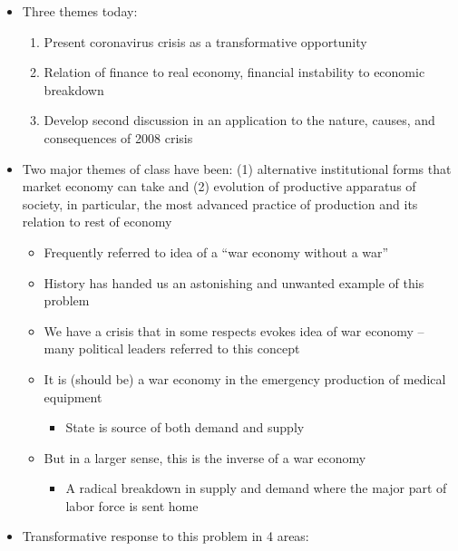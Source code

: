 \begin{itemize}
\tightlist
\item
  Three themes today:

  \begin{enumerate}
  \def\labelenumi{\arabic{enumi}.}
  \tightlist
  \item
    Present coronavirus crisis as a transformative opportunity
  \item
    Relation of finance to real economy, financial instability to
    economic breakdown
  \item
    Develop second discussion in an application to the nature, causes,
    and consequences of 2008 crisis
  \end{enumerate}
\item
  Two major themes of class have been: (1) alternative institutional
  forms that market economy can take and (2) evolution of productive
  apparatus of society, in particular, the most advanced practice of
  production and its relation to rest of economy

  \begin{itemize}
  \tightlist
  \item
    Frequently referred to idea of a ``war economy without a war''
  \item
    History has handed us an astonishing and unwanted example of this
    problem
  \item
    We have a crisis that in some respects evokes idea of war economy --
    many political leaders referred to this concept
  \item
    It is (should be) a war economy in the emergency production of
    medical equipment

    \begin{itemize}
    \tightlist
    \item
      State is source of both demand and supply
    \end{itemize}
  \item
    But in a larger sense, this is the inverse of a war economy

    \begin{itemize}
    \tightlist
    \item
      A radical breakdown in supply and demand where the major part of
      labor force is sent home
    \end{itemize}
  \end{itemize}
\item
  Transformative response to this problem in 4 areas:


\end{itemize}
